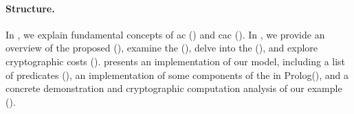 \paragraph{Structure.} In , we explain fundamental concepts of \gls{ac} () and \gls{cac} (). In , we provide an overview of the proposed \hybrid (), examine the \erbac (), delve into the \cac (), and explore cryptographic costs ().  presents an implementation of our model, including a list of predicates (), an implementation of some components of the \hybrid in Prolog(), and a concrete demonstration and cryptographic computation analysis of our example ().





